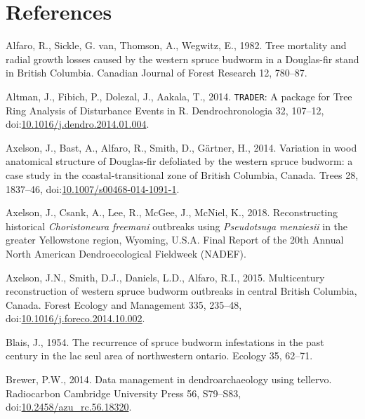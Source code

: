 \documentclass[review]{elsarticle} %
\begin{document}
\hypertarget{references}{%
\section*{References}\label{references}}

\hypertarget{refs}{}
\leavevmode\hypertarget{ref-Alfaro1982}{}%
Alfaro, R., Sickle, G. van, Thomson, A., Wegwitz, E., 1982. Tree mortality and radial growth losses caused by the western spruce budworm in a Douglas-fir stand in British Columbia. Canadian Journal of Forest Research 12, 780--87.

\leavevmode\hypertarget{ref-Altman2014}{}%
Altman, J., Fibich, P., Dolezal, J., Aakala, T., 2014. \texttt{TRADER}: A package for Tree Ring Analysis of Disturbance Events in R. Dendrochronologia 32, 107--12, doi:\href{https://doi.org/10.1016/j.dendro.2014.01.004}{10.1016/j.dendro.2014.01.004}.

\leavevmode\hypertarget{ref-Axelson2014}{}%
Axelson, J., Bast, A., Alfaro, R., Smith, D., Gärtner, H., 2014. Variation in wood anatomical structure of Douglas-fir defoliated by the western spruce budworm: a case study in the coastal-transitional zone of British Columbia, Canada. Trees 28, 1837--46, doi:\href{https://doi.org/10.1007/s00468-014-1091-1}{10.1007/s00468-014-1091-1}.

\leavevmode\hypertarget{ref-NADEF2018}{}%
Axelson, J., Csank, A., Lee, R., McGee, J., McNiel, K., 2018. Reconstructing historical \emph{Choristoneura freemani} outbreaks using \emph{Pseudotsuga menziesii} in the greater Yellowstone region, Wyoming, U.S.A. Final Report of the 20th Annual North American Dendroecological Fieldweek (NADEF).

\leavevmode\hypertarget{ref-Axelson2015}{}%
Axelson, J.N., Smith, D.J., Daniels, L.D., Alfaro, R.I., 2015. Multicentury reconstruction of western spruce budworm outbreaks in central British Columbia, Canada. Forest Ecology and Management 335, 235--48, doi:\href{https://doi.org/10.1016/j.foreco.2014.10.002}{10.1016/j.foreco.2014.10.002}.

\leavevmode\hypertarget{ref-Blais1954}{}%
Blais, J., 1954. The recurrence of spruce budworm infestations in the past century in the lac seul area of northwestern ontario. Ecology 35, 62--71.

\leavevmode\hypertarget{ref-Brewer2014}{}%
Brewer, P.W., 2014. Data management in dendroarchaeology using tellervo. Radiocarbon Cambridge University Press 56, S79--S83, doi:\href{https://doi.org/10.2458/azu_rc.56.18320}{10.2458/azu\_rc.56.18320}.
\end{document}
